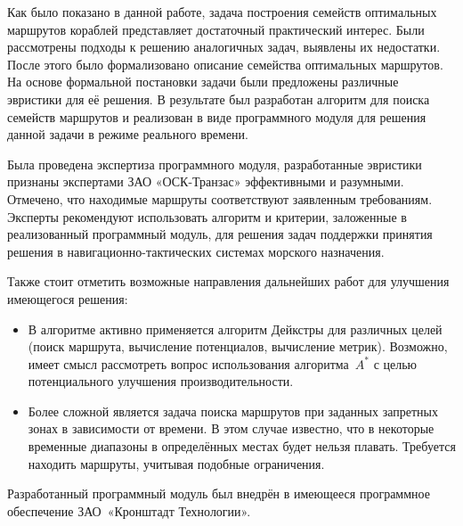 \startconclusionpage

Как было показано в данной работе, задача построения семейств
оптимальных маршрутов кораблей представляет достаточный практический
интерес. Были рассмотрены подходы к решению аналогичных задач,
выявлены их недостатки. После этого было формализовано описание
семейства оптимальных маршрутов. На основе формальной постановки
задачи были предложены различные эвристики для её решения. В
результате был разработан алгоритм для поиска семейств маршрутов и
реализован в виде программного модуля для решения данной задачи в
режиме реального времени.

Была проведена экспертиза программного модуля, разработанные эвристики
признаны экспертами ЗАО «ОСК-Транзас» эффективными и разумными.
Отмечено, что находимые маршруты соответствуют заявленным требованиям.
Эксперты рекомендуют использовать алгоритм и критерии, заложенные в
реализованный программный модуль, для решения задач поддержки принятия
решения в навигационно-тактических системах морского назначения.

Также стоит отметить возможные направления дальнейших работ для
улучшения имеющегося решения:
\begin{itemize}
    \item В алгоритме активно применяется алгоритм Дейкстры для различных
      целей (поиск маршрута, вычисление потенциалов, вычисление метрик).
      Возможно, имеет смысл рассмотреть вопрос использования
      алгоритма~$A^*$ с целью потенциального улучшения производительности.
    \item Более сложной является задача поиска маршрутов при заданных
      запретных зонах в зависимости от времени. В этом случае
      известно, что в некоторые временные диапазоны в определённых
      местах будет нельзя плавать. Требуется находить маршруты,
      учитывая подобные ограничения.
\end{itemize}

Разработанный программный модуль был внедрён в имеющееся программное
обеспечение ЗАО~«Кронштадт Технологии».

\FloatBarrier

